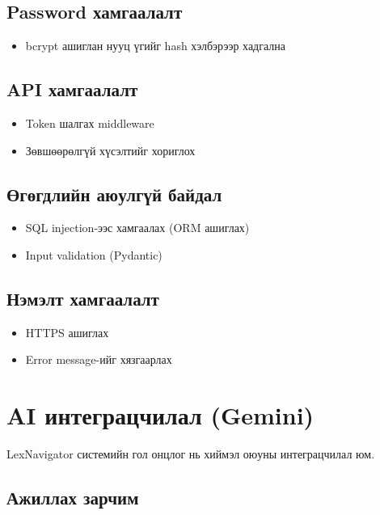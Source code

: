 \subsection{Password хамгаалалт}

\begin{itemize}
    \item bcrypt ашиглан нууц үгийг hash хэлбэрээр хадгална
\end{itemize}

\subsection{API хамгаалалт}

\begin{itemize}
    \item Token шалгах middleware
    \item Зөвшөөрөлгүй хүсэлтийг хориглох
\end{itemize}

\subsection{Өгөгдлийн аюулгүй байдал}

\begin{itemize}
    \item SQL injection-ээс хамгаалах (ORM ашиглах)
    \item Input validation (Pydantic)
\end{itemize}

\subsection{Нэмэлт хамгаалалт}

\begin{itemize}
    \item HTTPS ашиглах
    \item Error message-ийг хязгаарлах
\end{itemize}


\section{AI интеграцчилал (Gemini)}

LexNavigator системийн гол онцлог нь хиймэл оюуны интеграцчилал юм.

\subsection{Ажиллах зарчим}

